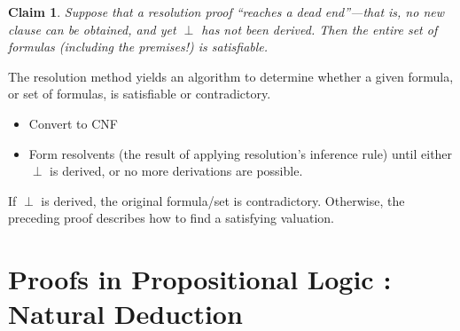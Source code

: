 \documentclass{article}
\newtheorem{claim}[theorem]{Claim}
\begin{document}
\begin{claim}
Suppose that a resolution proof “reaches a dead end”—that
is, no new clause can be obtained, and yet \(\perp\) has not been derived. Then the entire set of formulas (including the premises!) is satisfiable. 
\end{claim}

The resolution method yields an algorithm to determine whether a
given formula, or set of formulas, is satisfiable or contradictory.

\begin{itemize}
\item Convert to CNF
\item Form resolvents (the result of applying resolution’s inference
rule) until either \(\perp\) is derived, or no more derivations are
possible.
\end{itemize}

If \(\perp\)  is derived, the original formula/set is contradictory. Otherwise,
the preceding proof describes how to find a satisfying valuation.

\section{Proofs in Propositional Logic : Natural Deduction}
\end{document}
